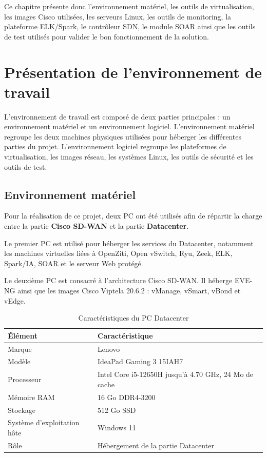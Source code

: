 \documentclass[12pt,a4paper,oneside]{report}
\begin{document}
	Ce chapitre présente donc l'environnement matériel, les outils de virtualisation, les images Cisco utilisées, les serveurs Linux, les outils de monitoring, la plateforme ELK/Spark, le contrôleur SDN, le module SOAR ainsi que les outils de test utilisés pour valider le bon fonctionnement de la solution.
	
	\section{Présentation de l'environnement de travail}
	
	L'environnement de travail est composé de deux parties principales : un environnement matériel et un environnement logiciel. L'environnement matériel regroupe les deux machines physiques utilisées pour héberger les différentes parties du projet. L'environnement logiciel regroupe les plateformes de virtualisation, les images réseau, les systèmes Linux, les outils de sécurité et les outils de test.
	
	\subsection{Environnement matériel}
	
	Pour la réalisation de ce projet, deux PC ont été utilisés afin de répartir la charge entre la partie \textbf{Cisco SD-WAN} et la partie \textbf{Datacenter}.
	
	Le premier PC est utilisé pour héberger les services du Datacenter, notamment les machines virtuelles liées à OpenZiti, Open vSwitch, Ryu, Zeek, ELK, Spark/IA, SOAR et le serveur Web protégé.
	
	Le deuxième PC est consacré à l'architecture Cisco SD-WAN. Il héberge EVE-NG ainsi que les images Cisco Viptela 20.6.2 : vManage, vSmart, vBond et vEdge.
	
	\begin{table}[H]
		\centering
		\renewcommand{\arraystretch}{1.2}
		\begin{tabular}{|p{}|p{}|}
			\hline
			\textbf{Élément} & \textbf{Caractéristique} \\
			\hline
			Marque & Lenovo \\
			\hline
			Modèle & IdeaPad Gaming 3 15IAH7 \\
			\hline
			Processeur & Intel Core i5-12650H jusqu'à 4.70 GHz, 24 Mo de cache \\
			\hline
			Mémoire RAM & 16 Go DDR4-3200 \\
			\hline
			Stockage & 512 Go SSD \\
			\hline
			Système d'exploitation hôte & Windows 11 \\
			\hline
			Rôle & Hébergement de la partie Datacenter \\
			\hline
		\end{tabular}
		\caption{Caractéristiques du PC Datacenter}
		\label{tab:pc-datacenter}
	\end{table}
	
\end{document}
